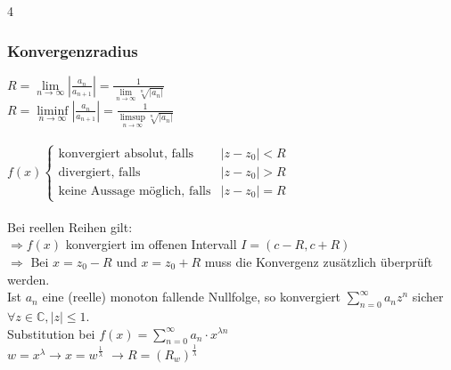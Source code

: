 \documentclass[6pt,a4paper]{scrartcl}
\newcommand{\abs}[1]{\ensuremath{\left\vert#1\right\vert}}
\newcommand{\Ra}[0]{\ensuremath{\Rightarrow}}
\begin{document}
\begin{multicols*}{4}
    \subsubsection{Konvergenzradius}
    $R = \lim\limits_{n\rightarrow \infty} \abs{\frac{a_n}{a_{n+1}}}=\frac{1}{\lim\limits_{n\rightarrow \infty}\sqrt[n]{\abs{a_n}}}$ \\
    $R =\liminf\limits_{n\rightarrow \infty} \abs{\frac{a_n}{a_{n+1}}}=\frac{1}{\limsup\limits_{n\rightarrow \infty}\sqrt[n]{\abs{a_n}}}$ \\ \\
    $f(x)\begin{cases}
            \text{konvergiert absolut, falls}   & \abs{z-z_0} < R \\
            \text{divergiert, falls}            & \abs{z-z_0} > R \\
            \text{keine Aussage möglich, falls} & \abs{z-z_0} = R
        \end{cases}$\\ \\
    Bei reellen Reihen gilt: \\
    $\Ra f(x)$ konvergiert im offenen Intervall $I=(c-R,c+R)$ \\
    $\Ra$ Bei $x=z_0-R$ und $x=z_0+R$ muss die Konvergenz zusätzlich überprüft werden.\\

    Ist $a_n$ eine (reelle) monoton fallende Nullfolge, so konvergiert $\sum_{n=0}^{\infty}a_nz^n$ sicher $\forall z\in \mathbb C, |z| \le 1$.\\

    Substitution bei $f(x)=\sum_{n=0}^\infty a_n \cdot x^{\lambda n}$ \\
    $w=x^\lambda \rightarrow x=w^\frac{1}{\lambda}$
    $\rightarrow R=\left(R_w\right)^\frac{1}{\lambda}$

    \begin{sectionbox}

\end{sectionbox}
\end{multicols*}
\end{document}
